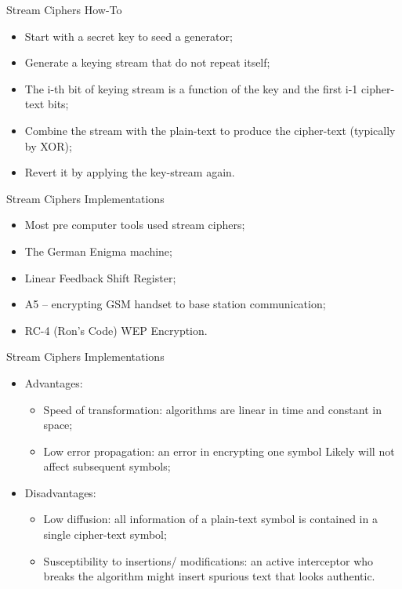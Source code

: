 \documentclass[12pt]{beamer}
\begin{document}
\begin{frame}{Stream Ciphers How-To}
\begin{itemize}
\item Start with a secret key to seed a generator;\pause
\item Generate a keying stream that do not repeat itself;\pause
\item The i-th bit of keying stream is a function of the key and the first i-1 cipher-text bits;\pause
\item Combine the stream with the plain-text to produce the cipher-text (typically by XOR);\pause
\item Revert it by applying the key-stream again.
\end{itemize}
\end{frame}

\begin{frame}{Stream Ciphers Implementations}
\begin{itemize}
\item Most pre computer tools used stream ciphers;\pause
\item The German Enigma machine;\pause
\item Linear Feedback Shift Register;\pause
\item A5 – encrypting GSM handset to base station communication;\pause
\item RC-4 (Ron’s Code) WEP Encryption.
\end{itemize}
\end{frame}

\begin{frame}{Stream Ciphers Implementations}
\begin{itemize}
\item Advantages:\pause
\begin{itemize}
\item Speed of transformation: algorithms are linear in time and constant in space;\pause
\item Low error propagation: an error in encrypting one symbol Likely will not affect subsequent symbols;\pause
\end{itemize}
\item Disadvantages:\pause
\begin{itemize}
\item Low diffusion: all information of a plain-text symbol is contained in a single cipher-text symbol;\pause
\item Susceptibility to insertions/ modifications: an active interceptor who breaks the algorithm might insert spurious text that looks authentic.
\end{itemize}
\end{itemize}
\end{frame}
\end{document}
